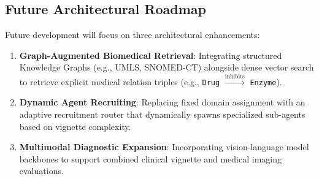 \subsection{Future Architectural Roadmap}

Future development will focus on three architectural enhancements:

\begin{enumerate}
    \item \textbf{Graph-Augmented Biomedical Retrieval}: Integrating structured Knowledge Graphs (e.g., UMLS, SNOMED-CT) alongside dense vector search to retrieve explicit medical relation triples (e.g., \texttt{Drug} $\xrightarrow{\text{inhibits}}$ \texttt{Enzyme}).
    \item \textbf{Dynamic Agent Recruiting}: Replacing fixed domain assignment with an adaptive recruitment router that dynamically spawns specialized sub-agents based on vignette complexity.
    \item \textbf{Multimodal Diagnostic Expansion}: Incorporating vision-language model backbones to support combined clinical vignette and medical imaging evaluations.
\end{enumerate}
